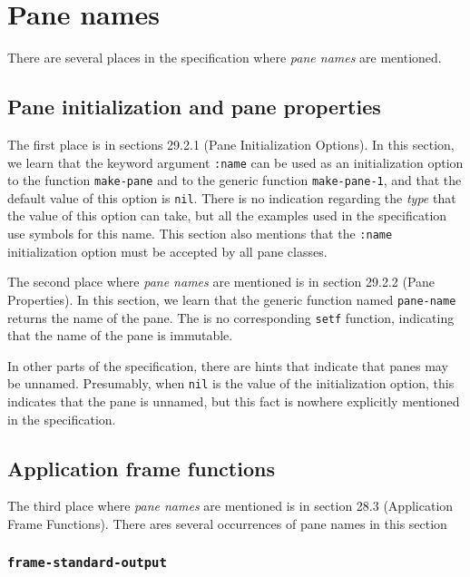 \chapter{Pane names}
\label{chap-spec-issue-pane-names}

There are several places in the specification where \emph{pane names}
are mentioned.

\section{Pane initialization and pane properties}
\label{sec-spec-issue-pane-name-pane-initialization-and-pane-properties}

The first place is in sections 29.2.1 (Pane Initialization Options).
In this section, we learn that the keyword argument \texttt{:name} can
be used as an initialization option to the function \texttt{make-pane}
and to the generic function \texttt{make-pane-1}, and that the default
value of this option is \texttt{nil}.  There is no indication
regarding the \emph{type} that the value of this option can take, but
all the examples used in the specification use symbols for this name.
This section also mentions that the \texttt{:name} initialization
option must be accepted by all pane classes.

The second place where \emph{pane names} are mentioned is in section
29.2.2 (Pane Properties).  In this section, we learn that the generic
function named \texttt{pane-name} returns the name of the pane.  The
is no corresponding \texttt{setf} function, indicating that the name
of the pane is immutable.

In other parts of the specification, there are hints that indicate
that panes may be unnamed.  Presumably, when \texttt{nil} is the value
of the initialization option, this indicates that the pane is unnamed,
but this fact is nowhere explicitly mentioned in the specification.

\section{Application frame functions}

The third place where \emph{pane names} are mentioned is in section
28.3 (Application Frame Functions).  There ares several occurrences of
pane names in this section

\subsection{\texttt{frame-standard-output}}

